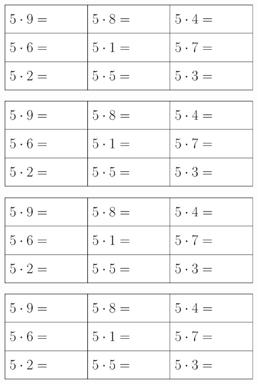 \newpage
	 \thispagestyle{empty}
\begin{figure}
	\includegraphics[]{g5}
\end{figure}
\vs
\begin{figure}
	\includegraphics[]{g5}
\end{figure}		
\vs
\begin{figure}
	\includegraphics[]{g5}
\end{figure}
\vs
\begin{figure}
	\includegraphics[]{g5}
\end{figure}




